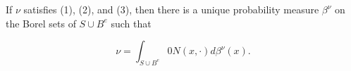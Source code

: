 If $\nu$ satisfies (1), (2), and (3), then there is a unique probability measure $\beta^\nu$ on the Borel sets of $S \cup B^e$ such that

$$\nu = \int_{S \cup B^e} 0 N(x, \cdot) d\beta^\nu(x).$$
